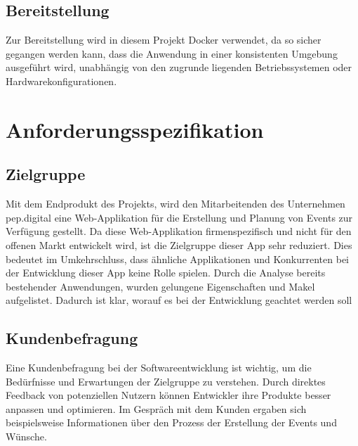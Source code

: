 \documentclass[a4paper,12pt]{article}
\begin{document}

\subsection{Bereitstellung}
Zur Bereitstellung wird in diesem Projekt Docker verwendet, da so sicher gegangen werden kann, dass die Anwendung in einer konsistenten Umgebung ausgeführt wird, unabhängig von den zugrunde liegenden Betriebssystemen oder Hardwarekonfigurationen.

\newpage


\section{Anforderungsspezifikation}


\subsection{Zielgruppe}
Mit dem Endprodukt des Projekts, wird den Mitarbeitenden des Unternehmen pep.digital eine Web-Applikation für die Erstellung und Planung von Events zur Verfügung gestellt. Da diese Web-Applikation firmenspezifisch und  nicht für den offenen Markt entwickelt wird, ist die Zielgruppe dieser App sehr reduziert. Dies bedeutet im Umkehrschluss, dass ähnliche Applikationen und Konkurrenten bei der Entwicklung dieser App keine Rolle spielen. Durch die Analyse bereits bestehender Anwendungen, wurden gelungene Eigenschaften und Makel aufgelistet. Dadurch ist klar, worauf es bei der Entwicklung geachtet werden soll


\subsection{Kundenbefragung}
Eine Kundenbefragung bei der Softwareentwicklung ist wichtig, um die Bedürfnisse und Erwartungen der Zielgruppe zu verstehen. Durch direktes Feedback von potenziellen Nutzern können Entwickler ihre Produkte besser anpassen und optimieren. Im Gespräch mit dem Kunden ergaben sich beispielsweise Informationen über den Prozess der Erstellung der Events und Wünsche.
\end{document}
